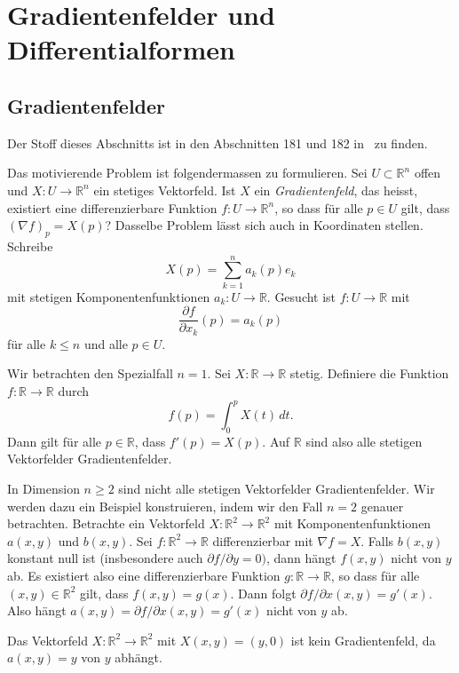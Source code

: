 \documentclass[../main.tex]{subfiles}
\begin{document}
\chapter{Gradientenfelder und Differentialformen}\label{chp:gradients}
\section{Gradientenfelder}
Der Stoff dieses Abschnitts ist in den
Abschnitten 181 und 182 in~\cite{heuser} zu finden.

Das motivierende Problem ist folgendermassen zu formulieren.
Sei $U \subset \mathbb{R}^n$ offen und
$X \colon U \to \mathbb{R}^n$ ein stetiges Vektorfeld.
Ist $X$ ein \emph{Gradientenfeld}, das heisst,
existiert
eine differenzierbare Funktion
$f \colon U \to \mathbb{R}^n$,
so dass für alle $p \in U$ gilt, dass ${(\nabla f)}_p = X(p)$?
Dasselbe Problem lässt sich auch in Koordinaten stellen.
Schreibe
\[
  X(p) = \sum_{k=1}^{n} a_k(p) e_k
\]
mit stetigen Komponentenfunktionen $a_k \colon U \to \mathbb{R}$.
Gesucht ist $f \colon U \to \mathbb{R}$ mit
\[
  \frac{\partial f}{\partial x_k} (p) = a_k(p)
\]
für alle
$k \leq n$ und alle $p \in U$.

\begin{specialcase}
  Wir betrachten den Spezialfall $n = 1$.
  Sei $X \colon \mathbb{R} \to \mathbb{R}$ stetig.
  Definiere die Funktion
  $f \colon \mathbb{R} \to \mathbb{R}$ 
  durch 
  \[
    f(p) = \int_{0}^{p} X(t) \, dt.
  \]
  Dann gilt für alle $p \in \mathbb{R}$,
  dass $f'(p) = X(p)$.
  Auf $\mathbb{R}$ sind also alle stetigen Vektorfelder Gradientenfelder.
\end{specialcase}

In Dimension $n \geq 2$ sind nicht alle stetigen
Vektorfelder Gradientenfelder.
Wir werden dazu ein Beispiel konstruieren, indem wir
den Fall $n = 2$ genauer betrachten.
Betrachte ein Vektorfeld $X \colon \mathbb{R}^2 \to \mathbb{R}^2$
mit Komponentenfunktionen $a(x, y)$ und $b(x, y)$.
Sei $f \colon \mathbb{R}^2 \to \mathbb{R}$ differenzierbar
mit $\nabla f = X$.
Falls $b(x, y)$ konstant null ist (insbesondere auch
$\partial f / \partial y = 0)$, dann hängt
$f(x, y)$ nicht von $y$ ab.
Es existiert also eine
differenzierbare Funktion
$g \colon \mathbb{R} \to \mathbb{R}$,
so dass für alle $(x, y) \in \mathbb{R}^2$ gilt,
dass $f(x, y) = g(x)$.
Dann folgt $\partial f / \partial x (x, y) = g'(x)$.
Also hängt $a(x, y) = \partial f / \partial x(x, y) = g'(x)$
nicht von $y$ ab.

\begin{example}
  Das Vektorfeld $X \colon \mathbb{R}^2 \to \mathbb{R}^2$ 
  mit $X(x, y) = (y, 0)$ ist kein Gradientenfeld,
  da $a(x, y) = y$ von $y$ abhängt.
\end{example}
\end{document}
